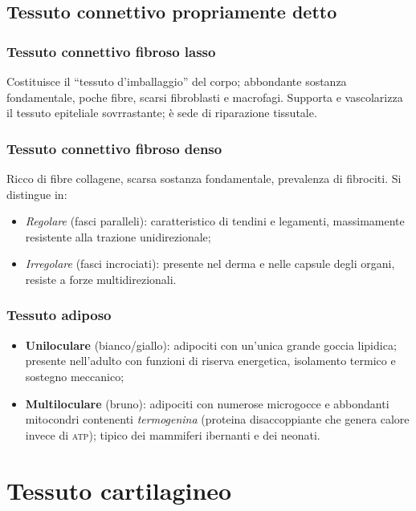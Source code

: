 \documentclass[11pt,a4paper,openright,twoside]{book}
\theoremstyle{definition}
\theoremstyle{plain}
\theoremstyle{remark}
\newcommand{\atp}{\textsc{atp}}
\begin{document}
\subsection{Tessuto connettivo propriamente detto}

\subsubsection{Tessuto connettivo fibroso lasso}
Costituisce il ``tessuto d'imballaggio'' del corpo; abbondante sostanza fondamentale, poche fibre, scarsi fibroblasti e macrofagi. Supporta e vascolarizza il tessuto epiteliale sovrrastante; è sede di riparazione tissutale.

\subsubsection{Tessuto connettivo fibroso denso}
Ricco di fibre collagene, scarsa sostanza fondamentale, prevalenza di fibrociti. Si distingue in:
\begin{itemize}
  \item \textit{Regolare} (fasci paralleli): caratteristico di tendini e legamenti, massimamente resistente alla trazione unidirezionale;
  \item \textit{Irregolare} (fasci incrociati): presente nel derma e nelle capsule degli organi, resiste a forze multidirezionali.
\end{itemize}

\subsubsection{Tessuto adiposo}
\begin{itemize}
  \item \textbf{Uniloculare} (bianco/giallo): adipociti con un'unica grande goccia lipidica; presente nell'adulto con funzioni di riserva energetica, isolamento termico e sostegno meccanico;
  \item \textbf{Multiloculare} (bruno): adipociti con numerose microgocce e abbondanti mitocondri contenenti \textit{termogenina} (proteina disaccoppiante che genera calore invece di \atp); tipico dei mammiferi ibernanti e dei neonati.
\end{itemize}

\section{Tessuto cartilagineo}
\end{document}
